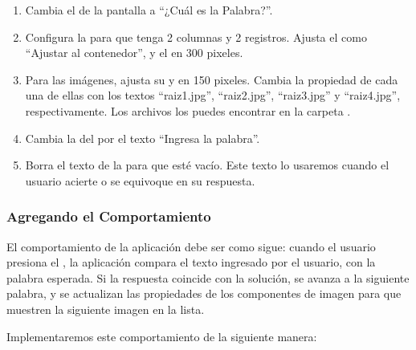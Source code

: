 \begin{enumerate}

\item Cambia el  de la pantalla a ``¿Cuál es la
  Palabra?''.

\item Configura la  para que tenga 2 columnas y 2
  registros. Ajusta el  como ``Ajustar al
  contenedor'', y el  en 300 pixeles.

\item Para las imágenes, ajusta su  y 
  en 150 pixeles. Cambia la propiedad  de cada una de
  ellas con los textos ``raiz1.jpg'', ``raiz2.jpg'', ``raiz3.jpg'' y
  ``raiz4.jpg'', respectivamente. Los archivos los puedes encontrar en
  la carpeta .

\item Cambia la  del
   por el texto ``Ingresa la
  palabra''.

\item Borra el texto de la  para que esté
  vacío. Este texto lo usaremos cuando el usuario acierte o se
  equivoque en su respuesta.

\end{enumerate}

\subsubsection*{Agregando el Comportamiento}

El comportamiento de la aplicación debe ser como sigue: cuando el
usuario presiona el , la aplicación compara
el texto ingresado por el usuario, con la palabra esperada. Si la
respuesta coincide con la solución, se avanza a la siguiente palabra,
y se actualizan las propiedades  de los componentes de
imagen para que muestren la siguiente imagen en la lista.

Implementaremos este comportamiento de la siguiente manera:


